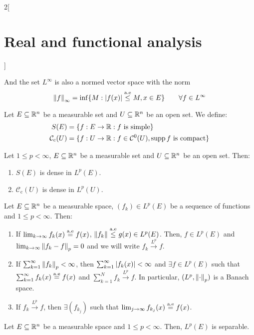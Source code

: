 \documentclass[../../../main_math.tex]{subfiles}
\begin{document}
\begin{multicols}{2}[\section{Real and functional analysis}]
\begin{proposition}
    And the set $L^\infty$ is also a normed vector space with the norm $$\left\|{f}\right\|_\infty=\inf \{M:\abs{{f}(x)}\overset{\text{a.e}}{\leq} M, x\in E\}\qquad\forall{f}\in L^\infty$$
  \end{proposition}
  \begin{definition}
    Let $E\subseteq\mathbb{R}^n$ be a measurable set and $U\subseteq \mathbb{R}^n$ be an open set. We define:
    \begin{align*}
      S(E)                        & =\{f:E\rightarrow\mathbb{R}:f\text{ is simple}\}                             \\
      \mathcal{C}_{\textrm{c}}(U) & =\{f:U\rightarrow\mathbb{R}:f\in\mathcal{C}^0(U),\operatorname{supp} f\text{ is compact}\}
    \end{align*}
  \end{definition}
  \begin{theorem}
    Let $1\leq p<\infty$, $E\subseteq\mathbb{R}^n$ be a measurable set and $U\subseteq \mathbb{R}^n$ be an open set. Then:
    \begin{enumerate}
      \item $S(E)$ is dense in $L^p(E)$.
      \item $\mathcal{C}_{\textrm{c}}(U)$ is dense in $L^p(U)$.
    \end{enumerate}
  \end{theorem}
  \begin{theorem}
    Let $E\subseteq\mathbb{R}^n$ be a measurable space, $({f}_k)\in L^p(E)$ be a sequence of functions and $1\leq p<\infty$. Then:
    \begin{enumerate}
      \item If $\lim_{k\to\infty}f_k(x)\overset{\text{a.e}}{=}{f}(x)$, $\left\|{f}_k\right\|\overset{\text{a.e}}{\leq} g(x)\in L^p(E)$. Then, ${f}\in L^p(E)$ and $\lim_{k\to\infty}\left\|{f}_k-{f}\right\|_p=0$ and we will write ${f}_k\overset{L^p}{\rightarrow}{f}$.
      \item If $\sum_{k=1}^\infty\left\|{f}_k\right\|_p<\infty$, then $\sum_{k=1}^\infty\abs{f_k(x)}<\infty$ and $\exists f\in L^p(E)$ such that $\sum_{k=1}^\infty f_k(x)\overset{\text{a.e}}{=}f(x)$ and $\sum_{k=1}^N{f}_k\overset{L^p}{\rightarrow}{f}$. In particular, $(L^p,\left\|\cdot\right\|_p)$ is a Banach space.
      \item If ${f}_k\overset{L^p}{\rightarrow}{f}$, then $\exists(f_{k_j})$ such that $\lim_{j\to\infty}f_{k_j}(x)\overset{\text{a.e}}{=}{f}(x)$.
    \end{enumerate}
  \end{theorem}
  \begin{theorem}
    Let $E\subseteq\mathbb{R}^n$ be a measurable space and $1\leq p<\infty$. Then, $L^p(E)$ is separable.

\end{theorem}
\end{multicols}
\end{document}
